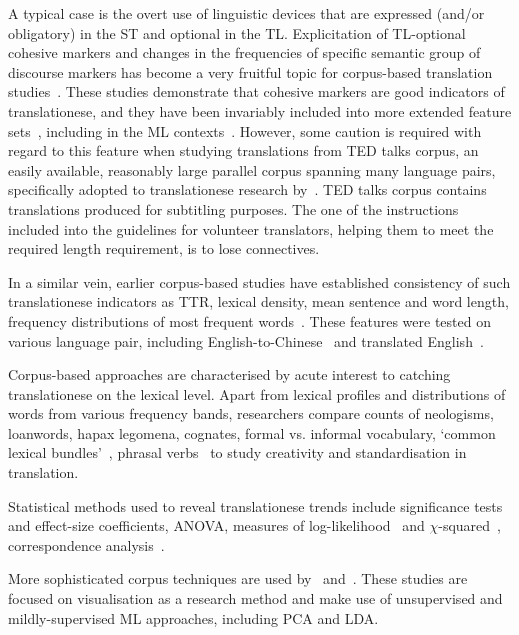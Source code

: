 A typical case is the overt use of linguistic devices that are expressed (and/or obligatory) in the \gls{ST} and optional in the \gls{TL}. 
Explicitation of TL-optional cohesive markers and changes in the frequencies of specific semantic group of discourse markers has become a very fruitful topic for corpus-based translation studies~\cite{Olohan2001,Nakamura2007,Castagnoli2009,Becher2011,Kunilovskaya2017conn}. These studies demonstrate that cohesive markers are good indicators of translationese, and they have been invariably included into more extended feature sets~\cite{Puurtinen2003,Rabadan2009,Xiao2010,Redelinghuys2015}, including in the ML contexts~\cite{Volansky2015}.
However, some caution is required with regard to this feature when studying translations from TED talks corpus, an easily available, reasonably large parallel corpus spanning many language pairs, specifically adopted to translationese research by~\citet{Karakanta2018}. TED talks corpus contains translations produced for subtitling purposes. The one of the instructions included into the guidelines for volunteer translators, helping them to meet the required length requirement, is to lose connectives.  

In a similar vein, earlier corpus-based studies have established consistency of such translationese indicators as \gls{TTR}, lexical density, mean sentence and word length, frequency distributions of most frequent words~\cite[known as `list head' from][]{Laviosa1998}. These features were tested on various language pair, including English-to-Chinese~\cite{Xiao2010} and translated English~\cite{Kruger2012,Redelinghuys2015}.

Corpus-based approaches are characterised by acute interest to catching translationese on the lexical level. Apart from lexical profiles and distributions of words from various frequency bands, researchers compare counts of neologisms, loanwords, hapax legomena, cognates, formal vs. informal vocabulary, `common lexical bundles'~\cite{Kruger2010}, phrasal verbs~\cite{Cappelle2017} to study creativity and standardisation in translation.

Statistical methods used to reveal translationese trends include significance tests and effect-size coefficients, \gls{ANOVA}, measures of log-likelihood~\cite{Xiao2010} and $\chi$-squared~\cite{Cappelle2017}, correspondence analysis~\cite{Delaere2012}.

More sophisticated corpus techniques are used by~\citet{Sutter2017} and~\citet{Evert2017}. These studies are focused on visualisation as a research method and make use of unsupervised and mildly-supervised ML approaches, including \gls{PCA} and \gls{LDA}.

